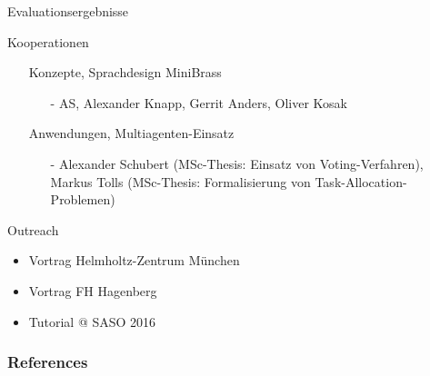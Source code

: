 \documentclass[handout,10pt,xcolor={dvipsnames},fleqn]{beamer}
\begin{document}
\begin{frame}{Evaluationsergebnisse}

\end{frame}

\begin{frame}{Kooperationen}
\begin{itemize}
\item[] \alert{Konzepte, Sprachdesign MiniBrass}
\begin{itemize}
\item[-] AS, Alexander Knapp, Gerrit Anders, Oliver Kosak
\end{itemize}
\item[] \alert{Anwendungen, Multiagenten-Einsatz}
\begin{itemize}
\item[-] Alexander Schubert (MSc-Thesis: Einsatz von Voting-Verfahren), Markus Tolls (MSc-Thesis: Formalisierung von Task-Allocation-Problemen)
\end{itemize}
\end{itemize}
\end{frame}

\begin{frame}{Outreach}
\begin{itemize}
\item Vortrag Helmholtz-Zentrum München
\item Vortrag FH Hagenberg
\item Tutorial @ SASO 2016
\end{itemize}
\end{frame}



\begin{frame}[allowframebreaks]
        \frametitle{References}
        
        
\end{frame}
\end{document}
